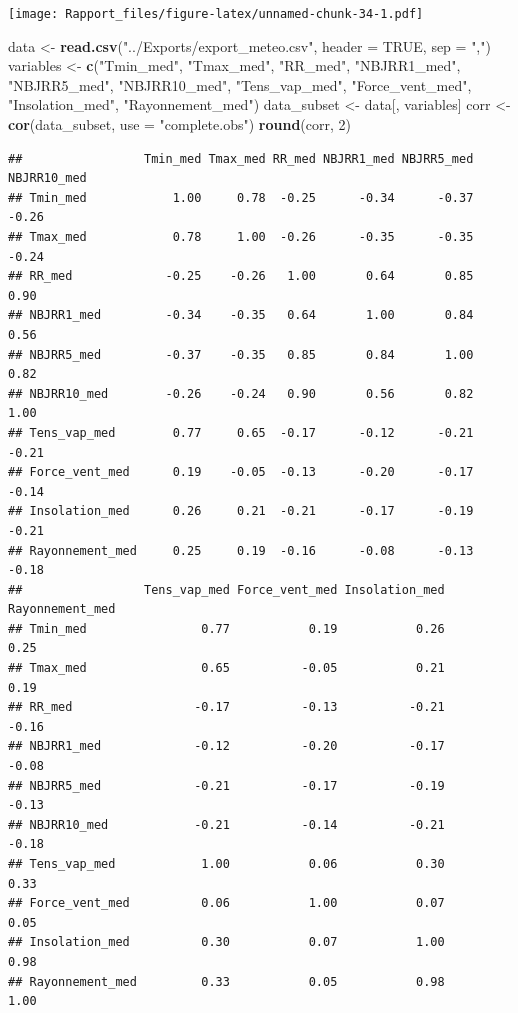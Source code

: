 \documentclass[
]{article}
\newenvironment{Shaded}{\begin{snugshade}}{\end{snugshade}}
\newcommand{\AttributeTok}[1]{\textcolor[rgb]{0.13,0.29,0.53}{#1}}
\newcommand{\ConstantTok}[1]{\textcolor[rgb]{0.56,0.35,0.01}{#1}}
\newcommand{\DecValTok}[1]{\textcolor[rgb]{0.00,0.00,0.81}{#1}}
\newcommand{\FunctionTok}[1]{\textcolor[rgb]{0.13,0.29,0.53}{\textbf{#1}}}
\newcommand{\NormalTok}[1]{#1}
\newcommand{\OtherTok}[1]{\textcolor[rgb]{0.56,0.35,0.01}{#1}}
\newcommand{\StringTok}[1]{\textcolor[rgb]{0.31,0.60,0.02}{#1}}
\begin{document}
\texttt{[image: Rapport\_files/figure-latex/unnamed-chunk-34-1.pdf]}

\begin{Shaded}
\begin{Highlighting}[]
\NormalTok{ data }\OtherTok{\textless{}{-}} \FunctionTok{read.csv}\NormalTok{(}\StringTok{"../Exports/export\_meteo.csv"}\NormalTok{, }\AttributeTok{header =} \ConstantTok{TRUE}\NormalTok{, }\AttributeTok{sep =} \StringTok{","}\NormalTok{)}
\NormalTok{  variables }\OtherTok{\textless{}{-}} \FunctionTok{c}\NormalTok{(}\StringTok{"Tmin\_med"}\NormalTok{, }\StringTok{"Tmax\_med"}\NormalTok{, }\StringTok{"RR\_med"}\NormalTok{, }\StringTok{"NBJRR1\_med"}\NormalTok{, }\StringTok{"NBJRR5\_med"}\NormalTok{, }
                 \StringTok{"NBJRR10\_med"}\NormalTok{, }\StringTok{"Tens\_vap\_med"}\NormalTok{, }\StringTok{"Force\_vent\_med"}\NormalTok{, }
                 \StringTok{"Insolation\_med"}\NormalTok{, }\StringTok{"Rayonnement\_med"}\NormalTok{)}
\NormalTok{  data\_subset }\OtherTok{\textless{}{-}}\NormalTok{ data[, variables]}
\NormalTok{  corr }\OtherTok{\textless{}{-}} \FunctionTok{cor}\NormalTok{(data\_subset, }\AttributeTok{use =} \StringTok{"complete.obs"}\NormalTok{)}
  \FunctionTok{round}\NormalTok{(corr, }\DecValTok{2}\NormalTok{)}
\end{Highlighting}
\end{Shaded}

\begin{verbatim}
##                 Tmin_med Tmax_med RR_med NBJRR1_med NBJRR5_med NBJRR10_med
## Tmin_med            1.00     0.78  -0.25      -0.34      -0.37       -0.26
## Tmax_med            0.78     1.00  -0.26      -0.35      -0.35       -0.24
## RR_med             -0.25    -0.26   1.00       0.64       0.85        0.90
## NBJRR1_med         -0.34    -0.35   0.64       1.00       0.84        0.56
## NBJRR5_med         -0.37    -0.35   0.85       0.84       1.00        0.82
## NBJRR10_med        -0.26    -0.24   0.90       0.56       0.82        1.00
## Tens_vap_med        0.77     0.65  -0.17      -0.12      -0.21       -0.21
## Force_vent_med      0.19    -0.05  -0.13      -0.20      -0.17       -0.14
## Insolation_med      0.26     0.21  -0.21      -0.17      -0.19       -0.21
## Rayonnement_med     0.25     0.19  -0.16      -0.08      -0.13       -0.18
##                 Tens_vap_med Force_vent_med Insolation_med Rayonnement_med
## Tmin_med                0.77           0.19           0.26            0.25
## Tmax_med                0.65          -0.05           0.21            0.19
## RR_med                 -0.17          -0.13          -0.21           -0.16
## NBJRR1_med             -0.12          -0.20          -0.17           -0.08
## NBJRR5_med             -0.21          -0.17          -0.19           -0.13
## NBJRR10_med            -0.21          -0.14          -0.21           -0.18
## Tens_vap_med            1.00           0.06           0.30            0.33
## Force_vent_med          0.06           1.00           0.07            0.05
## Insolation_med          0.30           0.07           1.00            0.98
## Rayonnement_med         0.33           0.05           0.98            1.00
\end{verbatim}
\end{document}
